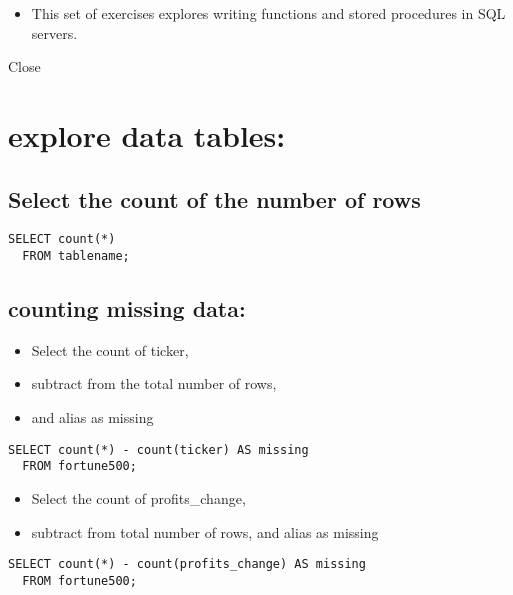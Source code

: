 \documentclass[]{book}
\providecommand{\tightlist}{%
  \setlength{\itemsep}{0pt}\setlength{\parskip}{0pt}}
\begin{document}
\begin{itemize}
\tightlist
\item
  This set of exercises explores writing functions and stored procedures in SQL servers.
\end{itemize}

Close

\hypertarget{explore-data-tables}{%
\section{explore data tables:}\label{explore-data-tables}}

\hypertarget{select-the-count-of-the-number-of-rows}{%
\subsection{Select the count of the number of rows}\label{select-the-count-of-the-number-of-rows}}

\begin{verbatim}
SELECT count(*) 
  FROM tablename;
\end{verbatim}

\hypertarget{counting-missing-data}{%
\subsection{counting missing data:}\label{counting-missing-data}}

\begin{itemize}
\tightlist
\item
  Select the count of ticker,
\item
  subtract from the total number of rows,
\item
  and alias as missing
\end{itemize}

\begin{verbatim}
SELECT count(*) - count(ticker) AS missing
  FROM fortune500;
\end{verbatim}

\begin{itemize}
\tightlist
\item
  Select the count of profits\_change,
\item
  subtract from total number of rows, and alias as missing
\end{itemize}

\begin{verbatim}
SELECT count(*) - count(profits_change) AS missing
  FROM fortune500;
\end{verbatim}
\end{document}

